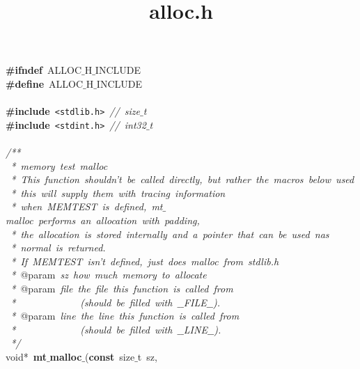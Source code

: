 \documentclass{article}
\title{alloc.h}
\date{}
\begin{document}
\maketitle

\noindent
\mbox{}\textbf{\#ifndef}\ ALLOC$\_$H$\_$INCLUDE \\
\mbox{}\textbf{\#define}\ ALLOC$\_$H$\_$INCLUDE \\
\mbox{} \\
\mbox{}\textbf{\#include}\ \texttt{\textless{}stdlib.h\textgreater{}}\ \textit{//\ size$\_$t} \\
\mbox{}\textbf{\#include}\ \texttt{\textless{}stdint.h\textgreater{}}\ \textit{//\ int32$\_$t} \\
\mbox{} \\
\mbox{}\textit{/**} \\
\mbox{}\textit{\ *\ memory\ test\ malloc} \\
\mbox{}\textit{\ *\ This\ function\ shouldn't\ be\ called\ directly,\ but\ rather\ the\ macros\ below\ used} \\
\mbox{}\textit{\ *\ this\ will\ supply\ them\ with\ tracing\ information} \\
\mbox{}\textit{\ *\ when\ MEMTEST\ is\ defined,\ mt$\_$malloc\ performs\ an\ allocation\ with\ padding,} \\
\mbox{}\textit{\ *\ the\ allocation\ is\ stored\ internally\ and\ a\ pointer\ that\ can\ be\ used\ nas} \\
\mbox{}\textit{\ *\ normal\ is\ returned.} \\
\mbox{}\textit{\ *\ If\ MEMTEST\ isn't\ defined,\ just\ does\ malloc\ from\ stdlib.h} \\
\mbox{}\textit{\ *\ }@param\textit{\ sz\ how\ much\ memory\ to\ allocate} \\
\mbox{}\textit{\ *\ }@param\textit{\ file\ the\ file\ this\ function\ is\ called\ from} \\
\mbox{}\textit{\ *\ \ \ \ \ \ \ \ \ \ \ \ \ (should\ be\ filled\ with\ $\_$$\_$FILE$\_$$\_$).} \\
\mbox{}\textit{\ *\ }@param\textit{\ line\ the\ line\ this\ function\ is\ called\ from} \\
\mbox{}\textit{\ *\ \ \ \ \ \ \ \ \ \ \ \ \ (should\ be\ filled\ with\ $\_$$\_$LINE$\_$$\_$).} \\
\mbox{}\textit{\ */} \\
\mbox{}void*\ \textbf{mt$\_$malloc$\_$}(\textbf{const}\ size$\_$t\ sz, \\
\end{document}
